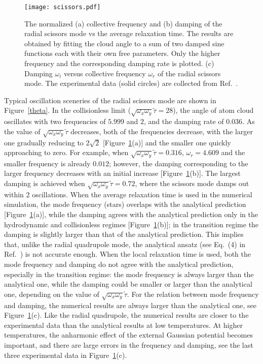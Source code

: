 \begin{figure}[tb]
\center
\texttt{[image: scissors.pdf]} 
\caption[The normalized (a) collective frequency and (b) damping of the radial scissors mode vs the average relaxation time. (c) Damping $\omega_i$ vs collective frequency $\omega_r$ of the radial scissors mode.]
{The normalized (a) collective frequency and (b) damping of the radial scissors mode vs the average relaxation time. The results are obtained by fitting the cloud angle to a sum of two damped sine functions each with their own free parameters. Only the higher frequency and the corresponding damping rate is plotted. (c) Damping $\omega_i$ versus collective frequency $\omega_r$ of the radial scissors mode. The experimental data (solid circles) are collected from Ref.~\cite{Wright2007}.}
\label{fig_scissors}
\end{figure}


Typical oscillation sceneries of the radial scissors mode are shown in Figure~\ref{theta}. In the collisionless limit ($\sqrt{\omega_x\omega_y}\widetilde{\tau}=28$), the angle of atom cloud oscillates with two frequencies of $5.999$ and $2$, and the damping rate of $0.036$. As the value of $\sqrt{\omega_x\omega_y}\widetilde{\tau}$ decreases, both of the frequencies decrease, with the larger one gradually reducing to $2\sqrt{2}$ [Figure~\ref{fig_scissors}(a)] and the smaller one quickly approaching to zero. For example, when $\sqrt{\omega_x\omega_y}\widetilde{\tau}=0.316$, $\omega_r=4.609$ and the smaller frequency is already $0.012$; however, the damping corresponding to the larger frequency decreases with an initial increase  [Figure~\ref{fig_scissors}(b)]. The largest damping is achieved when $\sqrt{\omega_x\omega_y}\widetilde{\tau}=0.72$, where the scissors mode damps out within 2 oscillations. When the average relaxation time is used in the numerical simulation, the mode frequency (stars) overlaps with the analytical prediction [Figure~\ref{fig_scissors}(a)], while the damping agrees with the analytical prediction only in the hydrodynamic and collisionless regimes [Figure~\ref{fig_scissors}(b)]; in the transition regime the damping is slightly larger than that of the analytical prediction. This implies that, unlike the radial quadrupole mode, the analytical ansatz (see Eq.~(4) in Ref.~\cite{Bruun2007}) is not accurate enough. When the local relaxation time is used, both the mode frequency and damping do not agree with the analytical prediction, especially in the transition regime: the mode frequency is always larger than the analytical one, while the damping could be smaller or larger than the analytical one, depending on the value of $\sqrt{\omega_x\omega_y}\widetilde{\tau}$. For the relation between mode frequency and damping, the numerical results are always larger than the analytical one, see Figure~\ref{fig_scissors}(c). Like the radial quadrupole, the numerical results are closer to the experimental data than the analytical results at low temperatures. At higher temperatures, the anharmonic effect of the external Gaussian potential becomes important, and there are large errors in the frequency and damping, see the last three experimental data in Figure~\ref{fig_scissors}(c).



